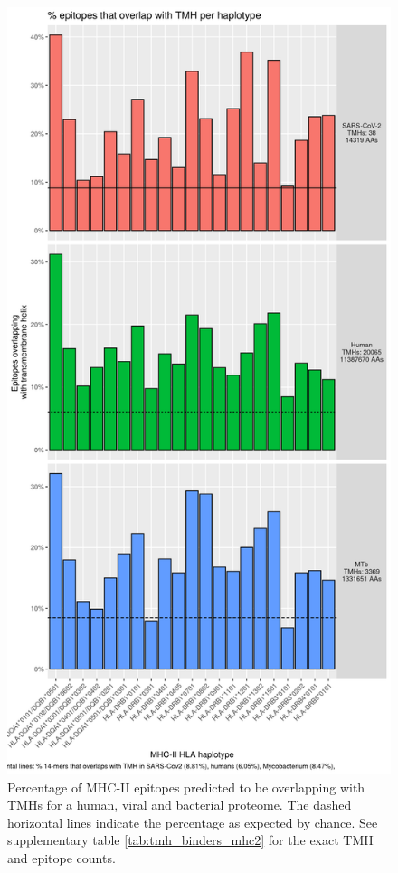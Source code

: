 \begin{figure}[!htbp]
  \includegraphics[height=0.8\textheight]{bbbq_1_smart_results/fig_f_tmh_mhc2_2_grid.png}
  \caption{
    Percentage of MHC-II epitopes predicted to be overlapping with TMHs
    for a human, viral and bacterial proteome.
    The dashed horizontal lines indicate the percentage as expected by chance.
    See supplementary table \ref{tab:tmh_binders_mhc2} for the exact TMH and epitope counts.
  }
  \label{fig:2}
\end{figure}

